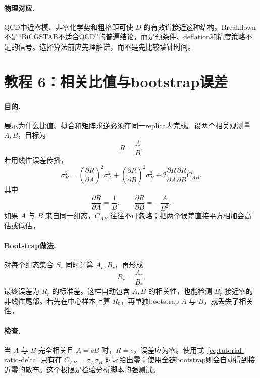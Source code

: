 \documentclass[UTF8,12pt,a4paper,twoside,openany]{ctexbook}
\begin{document}
\paragraph{物理对应.} QCD中近零模、非零化学势和粗格距可使 \(D\) 的有效谱接近这种结构。Breakdown不是“BiCGSTAB不适合QCD”的普遍结论，而是预条件、deflation和精度策略不足的信号。选择算法前应先理解谱，而不是先比较墙钟时间。

\section{教程 6：相关比值与bootstrap误差}

\paragraph{目的.} 展示为什么比值、拟合和矩阵求逆必须在同一replica内完成。设两个相关观测量 \(A,B\)，目标为
\begin{equation}
  R=\frac{A}{B}.
  \label{eq:tutorial-ratio}
\end{equation}
若用线性误差传播，
\begin{equation}
  \sigma_R^2
  =\left(\frac{\partial R}{\partial A}\right)^2\sigma_A^2
  +\left(\frac{\partial R}{\partial B}\right)^2\sigma_B^2
  +2\frac{\partial R}{\partial A}\frac{\partial R}{\partial B}C_{AB}.
  \label{eq:tutorial-ratio-delta}
\end{equation}
其中
\begin{equation}
  \frac{\partial R}{\partial A}=\frac1B,
  \qquad
  \frac{\partial R}{\partial B}=-\frac{A}{B^2}.
  \label{eq:tutorial-ratio-derivatives}
\end{equation}
如果 \(A\) 与 \(B\) 来自同一组态，\(C_{AB}\) 往往不可忽略；把两个误差直接平方相加会高估或低估。

\paragraph{Bootstrap做法.} 对每个组态集合 \(S_r\) 同时计算 \(A_r,B_r\)，再形成
\begin{equation}
  R_r=\frac{A_r}{B_r}.
  \label{eq:tutorial-ratio-bootstrap}
\end{equation}
最终误差为 \(R_r\) 的标准差。这样自动包含 \(A,B\) 的相关性，也能检测 \(B_r\) 接近零的非线性尾部。若先在中心样本上算 \(R_0\)，再单独bootstrap \(A\) 与 \(B\)，就丢失了相关性。

\paragraph{检查.} 当 \(A\) 与 \(B\) 完全相关且 \(A=cB\) 时，\(R=c\)，误差应为零。使用式~\eqref{eq:tutorial-ratio-delta} 只有在 \(C_{AB}=\sigma_A\sigma_B\) 时才给出零；使用全链bootstrap则会自动得到接近零的散布。这个极限是检验分析脚本的强测试。
\end{document}
